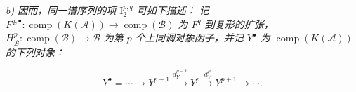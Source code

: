\noindent\textit{b) 因而，同一谱序列的项 $\mathrm I_2^{p,q}$ 可如下描述：
记 $F^{q,\bullet}\colon\operatorname{comp}(K(\mathcal A))
\longrightarrow\operatorname{comp}(\mathcal B)$ 为 $F^q$ 到复形的扩张，
$H_{\mathcal B}^p\colon\operatorname{comp}(\mathcal B)
\longrightarrow\mathcal B$ 为第 $p$ 个上同调对象函子，并记 $Y^\bullet$ 为
$\operatorname{comp}(K(\mathcal A))$ 的下列对象：}

\[
Y^\bullet=\cdots\longrightarrow Y^{p-1}
\xrightarrow{d_Y^{p-1}}Y^p\xrightarrow{d_Y^p}Y^{p+1}
\longrightarrow\cdots.
\]
\endgroup
